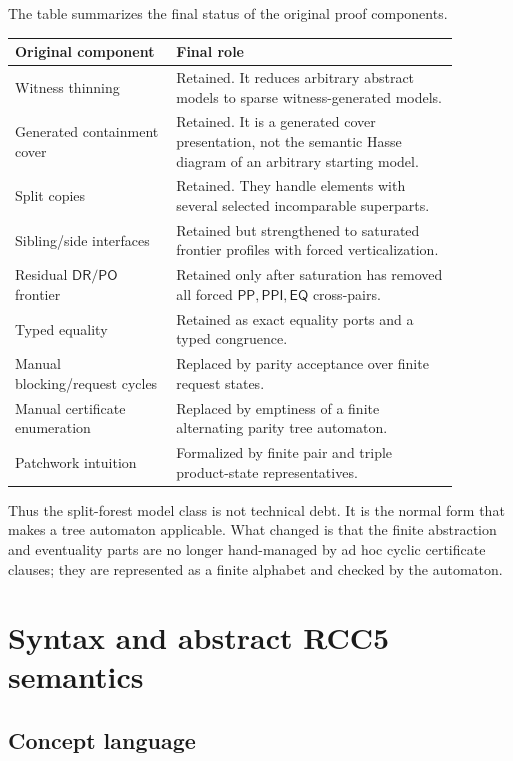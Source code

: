 \documentclass[11pt]{article}
\newcommand{\EQ}{\mathsf{EQ}}
\newcommand{\PP}{\mathsf{PP}}
\newcommand{\PPI}{\mathsf{PPI}}
\newcommand{\PO}{\mathsf{PO}}
\newcommand{\DR}{\mathsf{DR}}
\begin{document}
The table summarizes the final status of the original proof components.

\begin{center}
\begin{tabular}{p{0.32\linewidth}p{0.56\linewidth}}
\toprule
Original component & Final role \\
\midrule
Witness thinning & Retained.  It reduces arbitrary abstract models to sparse witness-generated models.\\
Generated containment cover & Retained.  It is a generated cover presentation, not the semantic Hasse diagram of an arbitrary starting model.\\
Split copies & Retained.  They handle elements with several selected incomparable superparts.\\
Sibling/side interfaces & Retained but strengthened to saturated frontier profiles with forced verticalization.\\
Residual $\DR/\PO$ frontier & Retained only after saturation has removed all forced $\PP,\PPI,\EQ$ cross-pairs.\\
Typed equality & Retained as exact equality ports and a typed congruence.\\
Manual blocking/request cycles & Replaced by parity acceptance over finite request states.\\
Manual certificate enumeration & Replaced by emptiness of a finite alternating parity tree automaton.\\
Patchwork intuition & Formalized by finite pair and triple product-state representatives.\\
\bottomrule
\end{tabular}
\end{center}

Thus the split-forest model class is not technical debt.  It is the normal form that makes a tree automaton applicable.  What changed is that the finite abstraction and eventuality parts are no longer hand-managed by ad hoc cyclic certificate clauses; they are represented as a finite alphabet and checked by the automaton.

\section{Syntax and abstract RCC5 semantics}

\subsection{Concept language}
\end{document}
